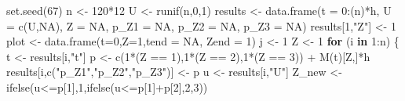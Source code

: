 \documentclass[a4paper,10pt,openany]{book}
\newenvironment{Shaded}{\begin{snugshade}}{\end{snugshade}}
\newcommand{\AttributeTok}[1]{\textcolor[rgb]{0.77,0.63,0.00}{#1}}
\newcommand{\ConstantTok}[1]{\textcolor[rgb]{0.00,0.00,0.00}{#1}}
\newcommand{\ControlFlowTok}[1]{\textcolor[rgb]{0.13,0.29,0.53}{\textbf{#1}}}
\newcommand{\DecValTok}[1]{\textcolor[rgb]{0.00,0.00,0.81}{#1}}
\newcommand{\FunctionTok}[1]{\textcolor[rgb]{0.00,0.00,0.00}{#1}}
\newcommand{\NormalTok}[1]{#1}
\newcommand{\OtherTok}[1]{\textcolor[rgb]{0.56,0.35,0.01}{#1}}
\newcommand{\SpecialCharTok}[1]{\textcolor[rgb]{0.00,0.00,0.00}{#1}}
\newcommand{\StringTok}[1]{\textcolor[rgb]{0.31,0.60,0.02}{#1}}
\begin{document}
\begin{Shaded}
\begin{Highlighting}[]
\FunctionTok{set.seed}\NormalTok{(}\DecValTok{67}\NormalTok{)}
\NormalTok{n }\OtherTok{\textless{}{-}} \DecValTok{120}\SpecialCharTok{*}\DecValTok{12}
\NormalTok{U }\OtherTok{\textless{}{-}} \FunctionTok{runif}\NormalTok{(n,}\DecValTok{0}\NormalTok{,}\DecValTok{1}\NormalTok{)}
\NormalTok{results }\OtherTok{\textless{}{-}} \FunctionTok{data.frame}\NormalTok{(}\AttributeTok{t =} \DecValTok{0}\SpecialCharTok{:}\NormalTok{(n)}\SpecialCharTok{*}\NormalTok{h,}
                      \AttributeTok{U =} \FunctionTok{c}\NormalTok{(U,}\ConstantTok{NA}\NormalTok{),}
                      \AttributeTok{Z =} \ConstantTok{NA}\NormalTok{,}
                      \AttributeTok{p\_Z1 =} \ConstantTok{NA}\NormalTok{,}
                      \AttributeTok{p\_Z2 =} \ConstantTok{NA}\NormalTok{,}
                      \AttributeTok{p\_Z3 =} \ConstantTok{NA}\NormalTok{)}
\NormalTok{results[}\DecValTok{1}\NormalTok{,}\StringTok{"Z"}\NormalTok{] }\OtherTok{\textless{}{-}} \DecValTok{1}
\NormalTok{plot }\OtherTok{\textless{}{-}} \FunctionTok{data.frame}\NormalTok{(}\AttributeTok{t=}\DecValTok{0}\NormalTok{,}\AttributeTok{Z=}\DecValTok{1}\NormalTok{,}\AttributeTok{tend =} \ConstantTok{NA}\NormalTok{, }\AttributeTok{Zend =} \DecValTok{1}\NormalTok{)}
\NormalTok{j }\OtherTok{\textless{}{-}} \DecValTok{1}
\NormalTok{Z }\OtherTok{\textless{}{-}} \DecValTok{1}
\ControlFlowTok{for}\NormalTok{ (i }\ControlFlowTok{in} \DecValTok{1}\SpecialCharTok{:}\NormalTok{n) \{}
\NormalTok{  t }\OtherTok{\textless{}{-}}\NormalTok{ results[i,}\StringTok{"t"}\NormalTok{]}
\NormalTok{  p }\OtherTok{\textless{}{-}} \FunctionTok{c}\NormalTok{(}\DecValTok{1}\SpecialCharTok{*}\NormalTok{(Z }\SpecialCharTok{==} \DecValTok{1}\NormalTok{),}\DecValTok{1}\SpecialCharTok{*}\NormalTok{(Z }\SpecialCharTok{==} \DecValTok{2}\NormalTok{),}\DecValTok{1}\SpecialCharTok{*}\NormalTok{(Z }\SpecialCharTok{==} \DecValTok{3}\NormalTok{)) }\SpecialCharTok{+}
    \FunctionTok{M}\NormalTok{(t)[Z,]}\SpecialCharTok{*}\NormalTok{h}
\NormalTok{  results[i,}\FunctionTok{c}\NormalTok{(}\StringTok{"p\_Z1"}\NormalTok{,}\StringTok{"p\_Z2"}\NormalTok{,}\StringTok{"p\_Z3"}\NormalTok{)] }\OtherTok{\textless{}{-}}\NormalTok{ p}
\NormalTok{  u }\OtherTok{\textless{}{-}}\NormalTok{ results[i,}\StringTok{"U"}\NormalTok{]}
\NormalTok{  Z\_new }\OtherTok{\textless{}{-}} \FunctionTok{ifelse}\NormalTok{(u}\SpecialCharTok{\textless{}=}\NormalTok{p[}\DecValTok{1}\NormalTok{],}\DecValTok{1}\NormalTok{,}\FunctionTok{ifelse}\NormalTok{(u}\SpecialCharTok{\textless{}=}\NormalTok{p[}\DecValTok{1}\NormalTok{]}\SpecialCharTok{+}\NormalTok{p[}\DecValTok{2}\NormalTok{],}\DecValTok{2}\NormalTok{,}\DecValTok{3}\NormalTok{))}

\end{Highlighting}
\end{Shaded}
\end{document}
